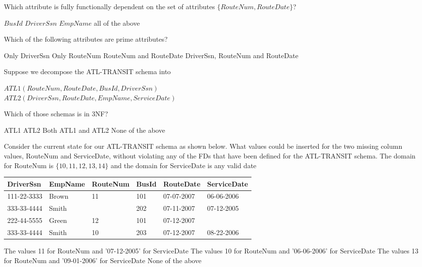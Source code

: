 \documentclass[10pt]{exam}
\begin{document}
\begin{questions}
\question[4] Which attribute is fully functionally dependent on the set of attributes $\{RouteNum, RouteDate\}$?

\begin{choices}
\choice $BusId$
\choice $DriverSsn$
\choice $EmpName$
\correctchoice all of the above
\end{choices}

\question[4] Which of the following attributes are prime attributes?

\begin{choices}
\choice Only DriverSsn
\choice Only RouteNum
\choice RouteNum and RouteDate
\correctchoice DriverSsn, RouteNum and RouteDate
\end{choices}

\question[4] Suppose we decompose the ATL-TRANSIT schema into

$ATL1(RouteNum, RouteDate, BusId, DriverSsn)$\\
$ATL2(DriverSsn, RouteDate, EmpName, ServiceDate)$

Which of those schemas is in 3NF?

\begin{choices}
\correctchoice ATL1
\choice ATL2
\choice Both ATL1 and ATL2
\choice None of the above
\end{choices}

\question[4] Consider the current state for our ATL-TRANSIT schema as shown below. What values could be inserted for the two missing column values, RouteNum and ServiceDate,  without violating any of the FDs that have been defined for the ATL-TRANSIT schema. The domain for RouteNum is $\{10, 11, 12, 13, 14\}$ and the domain for ServiceDate is any valid date

\begin{tabular}{|l|l|l|l|l|l|}\hline
{\bf DriverSsn} & {\bf EmpName} & {\bf RouteNum} & {\bf BusId} & {\bf RouteDate} & {\bf ServiceDate} \\\hline
111-22-3333 & Brown & 11 & 101 & 07-07-2007 & 06-06-2006 \\\hline
333-33-4444 & Smith & & 202 & 07-11-2007 & 07-12-2005 \\\hline
222-44-5555 & Green & 12 & 101 & 07-12-2007 & \\\hline
333-33-4444 & Smith & 10 & 203 & 07-12-2007 & 08-22-2006 \\\hline
\end{tabular}

\begin{choices}
\choice The values 11 for RouteNum and '07-12-2005' for ServiceDate
\correctchoice The values 10 for RouteNum and '06-06-2006' for ServiceDate
\choice The values 13 for RouteNum and '09-01-2006' for ServiceDate
\choice None of the above
\end{choices}

\end{questions}
\end{document}
